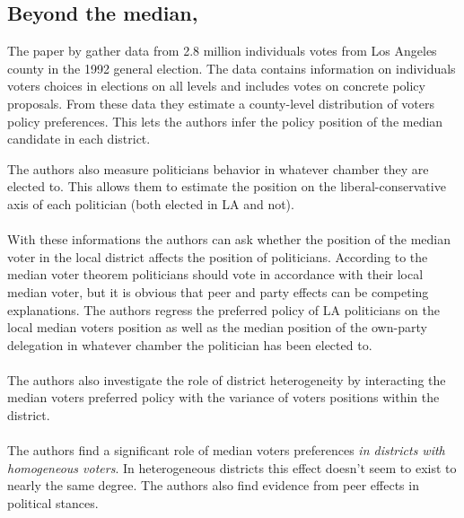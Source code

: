 \subsection{Beyond the median, \cite{gerber_beyond_2004}}
The paper by \citeauthor{gerber_beyond_2004} gather data from 2.8 million individuals votes from Los Angeles county in the 1992 general election. The data contains information on individuals voters choices in elections on all levels and includes votes on concrete policy proposals. From these data they estimate a county-level distribution of voters policy preferences. This lets the authors infer the policy position of the median candidate in each district. 

The authors also measure politicians behavior in whatever chamber they are elected to. This allows them to estimate the position on the liberal-conservative axis of each politician (both elected in LA and not). 
\\ \\
With these informations the authors can ask whether the position of the median voter in the local district affects the position of politicians. According to the median voter theorem politicians should vote in accordance with their local median voter, but it is obvious that peer and party effects can be competing explanations. The authors regress the preferred policy of LA politicians on the local median voters position as well as the median position of the own-party delegation in whatever chamber the politician has been elected to. 
\\ \\ 
The authors also investigate the role of district heterogeneity by interacting the median voters preferred policy with the variance of voters positions within the district. 
\\ \\ 
The authors find a significant role of median voters preferences \textit{in districts with homogeneous voters}. In heterogeneous districts this effect doesn't seem to exist to nearly the same degree. The authors also find evidence from peer effects in political stances.